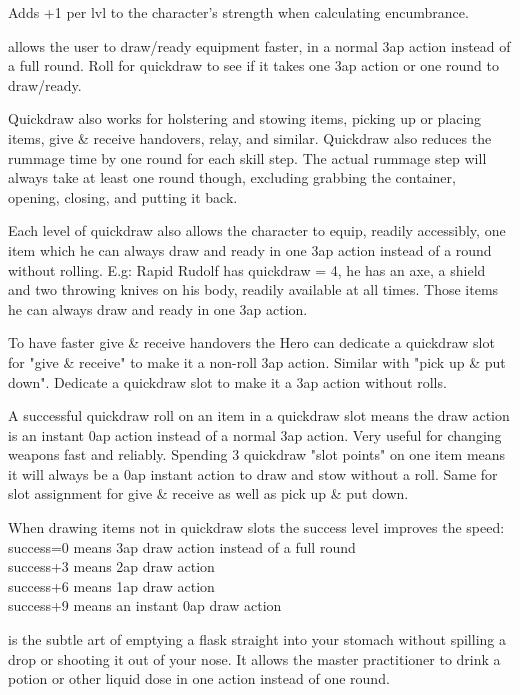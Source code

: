  Adds +1 per lvl to the character's strength when calculating encumbrance.


 allows the user to draw/ready equipment faster, in a normal 3ap action instead of a full round. Roll for quickdraw to see if it takes one 3ap action or one round to draw/ready.

Quickdraw also works for holstering and stowing items, picking up or placing items, give \& receive handovers, relay, and similar. %
Quickdraw also reduces the rummage time by one round for each skill step. The actual rummage step will always take at least one round though, excluding grabbing the container, opening, closing, and putting it back.

Each level of quickdraw also allows the character to equip, readily accessibly, one item which he can always draw and ready in one 3ap action instead of a round without rolling.
E.g: Rapid Rudolf has quickdraw = 4, he has an axe, a shield and two throwing knives on his body, readily available at all times. Those items he can always draw and ready in one 3ap action.

To have faster give \& receive handovers the Hero can dedicate a quickdraw slot for "give \& receive" to make it a non-roll 3ap action. %
Similar with "pick up \& put down". Dedicate a quickdraw slot to make it a 3ap action without rolls.

A successful quickdraw roll on an item in a quickdraw slot means the draw action is an instant 0ap action instead of a normal 3ap action. Very useful for changing weapons fast and reliably.
Spending 3 quickdraw "slot points" on one item means it will always be a 0ap instant action to draw and stow without a roll.
Same for slot assignment for give \& receive as well as pick up \& put down.

When drawing items not in quickdraw slots the success level improves the speed:\\
success=0 means 3ap draw action instead of a full round\\
success+3 means 2ap draw action\\
success+6 means 1ap draw action\\
success+9 means an instant 0ap draw action


 is the subtle art of emptying a flask straight into your stomach without spilling a drop or shooting it out of your nose. It allows the master practitioner to drink a potion or other liquid dose in one action instead of one round.

